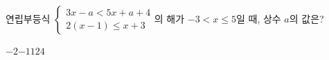 연립부등식 $\begin{cases} 3x-a<5x+a+4 \\ 2(x-1)\le x+3 \end{cases}$의 해가 $-3<x\le 5$일 때, 상수 $a$의 값은?
\begin{choices32}{$-2$}{$-1$}{$1$}{$2$}{$4$}\end{choices32}

